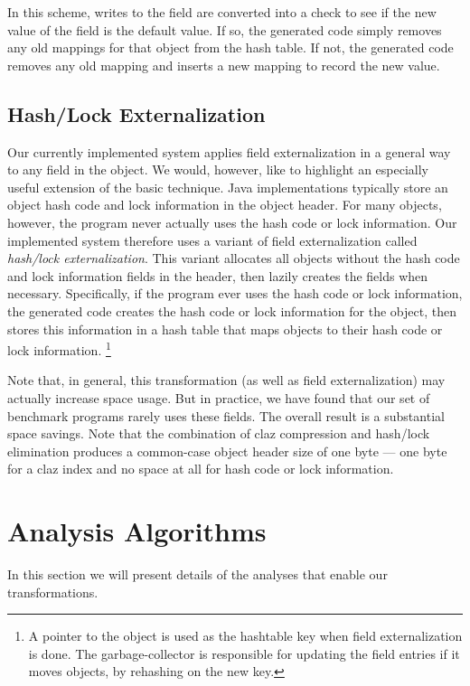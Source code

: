 \documentclass[oribibl]{llncs}
\begin{document}
In this scheme, writes to the field are converted into a check to see
if the new value of the field is the default value. If so, the 
generated code simply removes any old mappings for that 
object from the hash table.
If not, the generated code removes any old mapping and inserts a new
mapping to record the new value. 

\subsection{Hash/Lock Externalization}

Our currently implemented system applies field externalization
in a general way to any field in the object. We would, however,
like to highlight an especially useful extension of the basic
technique. Java implementations typically store an object
hash code and lock information in the object header. For many
objects, however, the program never actually uses the hash code
or lock information. Our implemented system therefore uses
a variant of field externalization called {\em hash/lock 
externalization}. This variant allocates all objects 
without the hash code and lock information fields in the header,
then lazily creates the fields when necessary. 
Specifically, if the program ever uses the hash code or lock information, 
the generated code creates the hash code or lock information
for the object, then stores this information in a hash table
that maps objects to their hash code or lock information.%
\footnote{A pointer to the object is used as the hashtable key when
  field externalization is done.  The garbage-collector is responsible
  for updating the field entries if it moves objects, by rehashing on
  the new key.}

Note that, in general, this transformation (as well as field
externalization) may actually increase space usage. But in
practice, we have found that our set of benchmark programs
rarely uses these fields. The overall result is a substantial
space savings. Note that the combination of claz compression 
and hash/lock elimination produces a common-case object header
size of one byte --- one byte for a claz index and no
space at all for hash code or lock information. 
%
\section{Analysis Algorithms}
%
In this section we will present details of the analyses that enable
our transformations.
%
\end{document}

